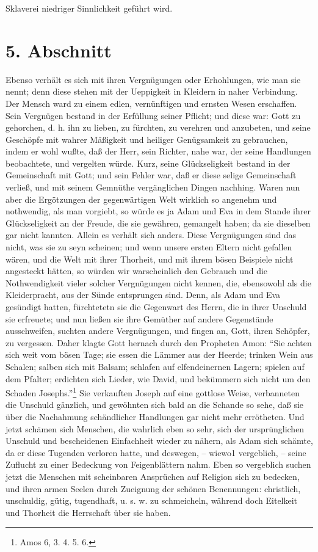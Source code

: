 Sklaverei niedriger Sinnlichkeit geführt wird.

\section{5. Abschnitt}

Ebenso verhält es sich mit ihren Vergnügungen oder Erhohlungen, wie man sie nennt; denn diese stehen mit der Ueppigkeit in Kleidern in naher Verbindung. Der Mensch ward zu einem edlen, vernünftigen und ernsten Wesen erschaffen. Sein Vergnügen bestand in der Erfüllung seiner Pflicht; und diese war: Gott zu gehorchen, d. h. ihn zu lieben, zu fürchten, zu verehren und anzubeten, und seine Geschöpfe mit wahrer Mäßigkeit und heiliger Genügsamkeit zu gebrauchen, indem er wohl wußte, daß der Herr, sein Richter, nahe war, der seine Handlungen beobachtete, und vergelten würde. Kurz, seine Glückseligkeit bestand in der Gemeinschaft mit Gott; und sein Fehler war, daß er diese selige Gemeinschaft verließ, und mit seinem Gemnüthe vergänglichen Dingen nachhing. Waren nun aber die Ergötzungen der gegenwärtigen Welt wirklich so angenehm und nothwendig, als man vorgiebt, so würde es ja Adam und Eva in dem Stande ihrer Glückseligkeit an der Freude, die sie gewähren, gemangelt haben; da sie dieselben gar nicht kannten. Allein es verhält sich anders. Diese Vergnügungen sind das nicht, was sie zu seyn scheinen; und wenn unsere ersten Eltern nicht gefallen wären, und die Welt mit ihrer Thorheit, und mit ihrem bösen Beispiele nicht angesteckt hätten, so würden wir warscheinlich den Gebrauch und die Nothwendigkeit vieler solcher Vergnügungen nicht kennen, die, ebensowohl als die Kleiderpracht, aus der Sünde entsprungen sind. Denn, als Adam und Eva gesündigt hatten, fürchtetetn sie die Gegenwart des Herrn, die in ihrer Unschuld sie erfreuete; und nun ließen sie ihre Gemüther auf andere Gegenstände ausschweifen, suchten andere Vergnügungen, und fingen an, Gott, ihren Schöpfer, zu vergessen. Daher klagte Gott hernach durch den Propheten Amon: "`Sie achten sich weit vom bösen Tage; sie essen die Lämmer aus der Heerde; trinken Wein aus Schalen; salben sich mit Balsam; schlafen auf elfendeinernen Lagern; spielen auf dem Pfalter; erdichten sich Lieder, wie David, und bekümmern sich nicht um den Schaden Josephs."'\footnote{Amos 6, 3. 4. 5. 6.} Sie verkauften Joseph auf eine gottlose Weise, verbanneten die Unschuld gänzlich, und gewöhnten sich bald an die Schande so sehe, daß sie über die Nachahmung schändlicher Handlungen gar nicht mehr errötheten. Und jetzt schämen sich Menschen, die wahrlich eben so sehr, sich der ursprünglichen Unschuld und bescheidenen Einfachheit wieder zu nähern, als Adam sich schämte, da er diese Tugenden verloren hatte, und deswegen, -- wiewo1 vergeblich, -- seine Zuflucht zu einer Bedeckung von Feigenblättern nahm. Eben so vergeblich suchen jetzt die Menschen mit scheinbaren Ansprüchen auf Religion sich zu bedecken, und ihren armen Seelen durch Zueignung der schönen Benennungen: christlich, unschuldig, gütig, tugendhaft, u. s. w. zu schmeicheln, während doch Eitelkeit und Thorheit die Herrschaft über sie haben.


